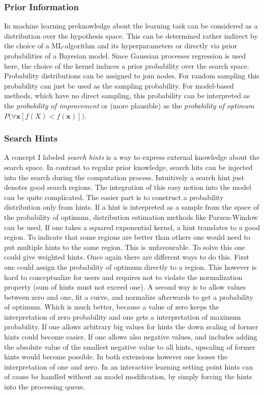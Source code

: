 \documentclass[english]{article}
\newcommand{\x}{\mathbf{x}}
\begin{document}
\subsubsection*{Prior Information}
In machine learning preknowledge about the learning task can be considered as a distribution over the hypothesis space. This can be determined rather indirect by the choice of a ML-algorithm and its hyperparameters or directly via prior probabilities of a Bayesian model. Since Gaussian processes regression is used here, the choice of the kernel induces a prior probability over the search space.
Probability distributions can be assigned to join nodes.  For random sampling this probability can just be used as the sampling probability. For model-based methods, which have no direct sampling, this probability can be interpreted as the \textit{probability of improvement} or (more plausible) as the \textit{probability of optimum} $P\big(\forall \x[f(X) < f(\x)]\big)$.

\subsubsection*{Search Hints}
A concept I labeled \textit{search hints} is a way to express external knowledge about the search space. In contrast to regular prior knowledge, search hits can be injected into the search during the computation process. Intuitively a search hint just denotes good search regions. The integration of this easy notion into the model can be quite complicated.
The easier part is to construct a probability distribution only from hints. If a hint is interpreted as a sample from the space of the probability of optimum, distribution estimation methods like Parzen-Window can be used. If one takes a squared exponential kernel, a hint translates to a good region. To indicate that some regions are better than others one would need to put multiple hints to the same region. This is unfavourable. To solve this one could give weighted hints. Once again there are different ways to do this.
First one could assign the probability of optimum directly to a region. This however is hard to conceptualize for users and requires not to violate the normalization property (sum of hints must not exceed one).
A second way is to allow values between zero and one, fit a curve, and normalize afterwards to get a probability of optimum. Which is much better, because a value of zero keeps the interpretation of zero probability and one gets a interpretation of maximum probability. If one allows arbitrary big values for hints the down scaling of former hints could become easier. If one allows also negative values, and includes adding the absolute value of the smallest negative value to all hints, upscaling of former hints would become possible. In both extensions however one looses the interpretation of one and zero.
In an interactive learning setting point hints can of cause be handled without an model modification, by simply forcing the hints into the processing queue.
\end{document}
